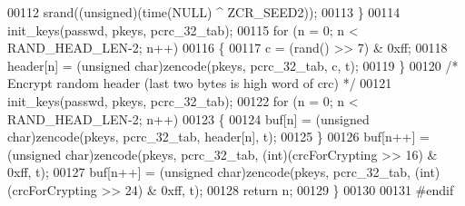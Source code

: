 \begin{DoxyCode}
00112         srand((\textcolor{keywordtype}{unsigned})(time(NULL) ^ ZCR\_SEED2));
00113     \}
00114     init\_keys(passwd, pkeys, pcrc\_32\_tab);
00115     \textcolor{keywordflow}{for} (n = 0; n < RAND\_HEAD\_LEN-2; n++)
00116     \{
00117         c = (rand() >> 7) & 0xff;
00118         header[n] = (\textcolor{keywordtype}{unsigned} char)zencode(pkeys, pcrc\_32\_tab, c, t);
00119     \}
00120     \textcolor{comment}{/* Encrypt random header (last two bytes is high word of crc) */}
00121     init\_keys(passwd, pkeys, pcrc\_32\_tab);
00122     \textcolor{keywordflow}{for} (n = 0; n < RAND\_HEAD\_LEN-2; n++)
00123     \{
00124         buf[n] = (\textcolor{keywordtype}{unsigned} char)zencode(pkeys, pcrc\_32\_tab, header[n], t);
00125     \}
00126     buf[n++] = (\textcolor{keywordtype}{unsigned} char)zencode(pkeys, pcrc\_32\_tab, (\textcolor{keywordtype}{int})(crcForCrypting >> 16) & 0xff, t);
00127     buf[n++] = (\textcolor{keywordtype}{unsigned} char)zencode(pkeys, pcrc\_32\_tab, (\textcolor{keywordtype}{int})(crcForCrypting >> 24) & 0xff, t);
00128     \textcolor{keywordflow}{return} n;
00129 \}
00130 
00131 \textcolor{preprocessor}{#endif}
\end{DoxyCode}
